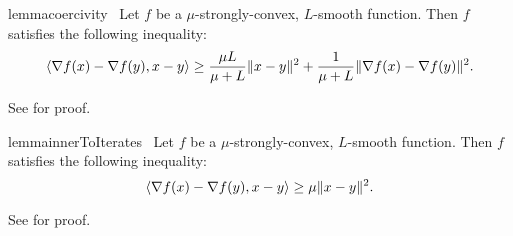 \begin{restatable}{lemma}{coercivity}~\label{lemma:coercivity}
    Let \( f \) be a \( \mu  \)-strongly-convex, \( L  \)-smooth function. 
    Then \( f \) satisfies the following inequality:
    \[ \left\langle\nabla f(x) - \nabla f(y), x - y\right\rangle \geq \frac{\mu L}{\mu + L}\|x - y\|^2 + \frac{1}{\mu + L} \|\nabla f(x) - \nabla f(y)\|^2.  \] 
\end{restatable}
\noindent See \citet[Lemma 3.11]{bubeck2015convex} for proof.

\begin{restatable}{lemma}{innerToIterates}~\label{lemma:inner-to-iterates}
    Let \( f \) be a \( \mu  \)-strongly-convex, \( L  \)-smooth function. 
    Then \( f \) satisfies the following inequality:
    \[ \left\langle\nabla f(x) - \nabla f(y), x - y\right\rangle \geq \mu\|x - y\|^2. \]
\end{restatable}
\noindent See \citet[Theorem 2.1.9]{nesterov2004lectures} for proof.
